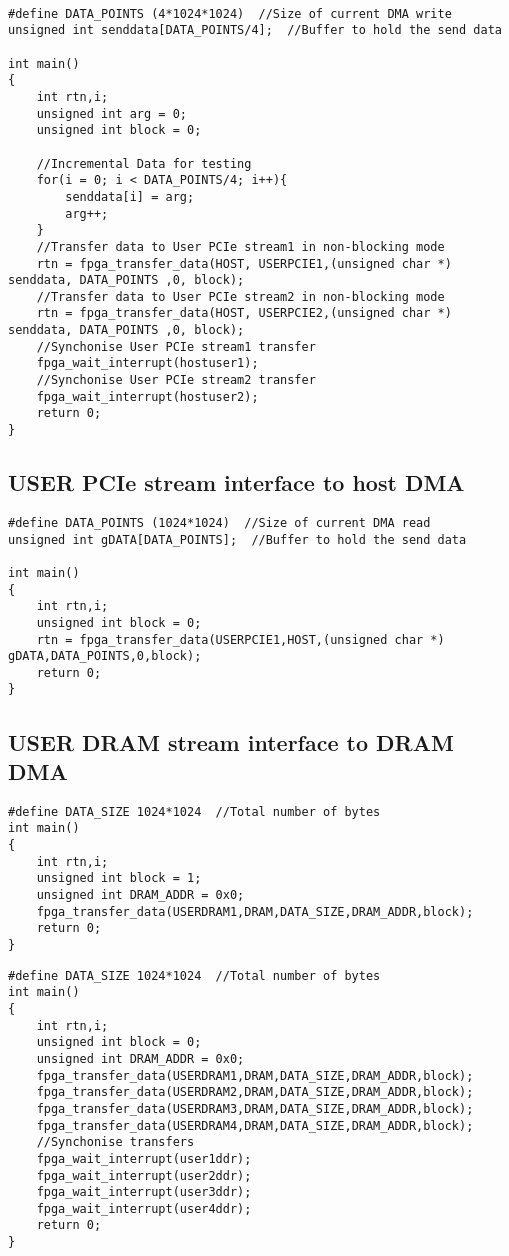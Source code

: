 \begin{verbatim}

#define DATA_POINTS (4*1024*1024)  //Size of current DMA write
unsigned int senddata[DATA_POINTS/4];  //Buffer to hold the send data

int main() 
{
    int rtn,i;
    unsigned int arg = 0;
    unsigned int block = 0;

    //Incremental Data for testing
    for(i = 0; i < DATA_POINTS/4; i++){
        senddata[i] = arg;
        arg++;
    }
    //Transfer data to User PCIe stream1 in non-blocking mode
    rtn = fpga_transfer_data(HOST, USERPCIE1,(unsigned char *) senddata, DATA_POINTS ,0, block);
    //Transfer data to User PCIe stream2 in non-blocking mode
    rtn = fpga_transfer_data(HOST, USERPCIE2,(unsigned char *) senddata, DATA_POINTS ,0, block);
    //Synchonise User PCIe stream1 transfer
    fpga_wait_interrupt(hostuser1);  
    //Synchonise User PCIe stream2 transfer
    fpga_wait_interrupt(hostuser2); 
    return 0;
}
\end{verbatim}

\subsection{USER PCIe stream interface to host DMA}

\begin{verbatim}
#define DATA_POINTS (1024*1024)  //Size of current DMA read
unsigned int gDATA[DATA_POINTS];  //Buffer to hold the send data

int main() 
{
    int rtn,i;
    unsigned int block = 0;
    rtn = fpga_transfer_data(USERPCIE1,HOST,(unsigned char *) gDATA,DATA_POINTS,0,block);
    return 0;
}   
\end{verbatim}

\subsection{USER DRAM stream interface to DRAM DMA}

\begin{verbatim}
#define DATA_SIZE 1024*1024  //Total number of bytes
int main() 
{
    int rtn,i;
    unsigned int block = 1;
    unsigned int DRAM_ADDR = 0x0;
    fpga_transfer_data(USERDRAM1,DRAM,DATA_SIZE,DRAM_ADDR,block);
    return 0;
} 
\end{verbatim} 


\begin{verbatim}
#define DATA_SIZE 1024*1024  //Total number of bytes
int main() 
{
    int rtn,i;
    unsigned int block = 0;
    unsigned int DRAM_ADDR = 0x0;
    fpga_transfer_data(USERDRAM1,DRAM,DATA_SIZE,DRAM_ADDR,block);
    fpga_transfer_data(USERDRAM2,DRAM,DATA_SIZE,DRAM_ADDR,block);
    fpga_transfer_data(USERDRAM3,DRAM,DATA_SIZE,DRAM_ADDR,block);
    fpga_transfer_data(USERDRAM4,DRAM,DATA_SIZE,DRAM_ADDR,block);
    //Synchonise transfers
    fpga_wait_interrupt(user1ddr);   
    fpga_wait_interrupt(user2ddr); 
    fpga_wait_interrupt(user3ddr); 
    fpga_wait_interrupt(user4ddr); 
    return 0;
} 
\end{verbatim}

